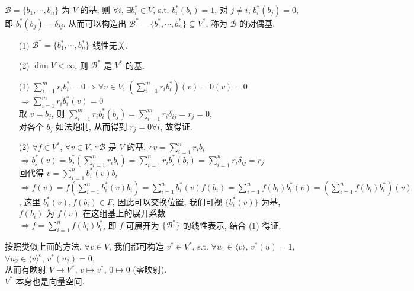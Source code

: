 \documentclass{note}
\begin{document}
\begin{df}[对偶基]
    $\mathcal{B}=\{b_1,\cdots,b_n\}$ 为 $V$ 的基, 则 $\forall i$, $\exists b_i^*\in V$, s.t. $b_i^*(b_i)=1$, 对 $j\neq i$, $b_i^*(b_j)=0$, 即 $b_i^*(b_j)=\delta_{ij}$, 从而可以构造出 $\mathcal{B}^*=\{b_1^*,\cdots,b_n^*\}\subseteq V^*$, 称为 $\mathcal{B}$ 的对偶基.
\end{df}

\begin{thm}[(课本定理 3.12)]
    \begin{itemize}
        \item[(1)] $\mathcal{B}^*=\{b_1^*,\cdots,b_n^*\}$ 线性无关.
        \item[(2)] $\dim V<\infty$, 则 $\mathcal{B}^*$ 是 $V^*$ 的基.
    \end{itemize}
\end{thm}
\begin{pf}
    \begin{itemize}
        \item[(1)] $\sum_{i=1}^mr_ib_i^*=0\Longrightarrow\forall v\in V$, $\left(\sum_{i=1}^mr_ib_i^*\right)(v)=0(v)=0$\\
        $\Longrightarrow\sum_{i=1}^mr_ib_i^*(v)=0$\\
        取 $v=b_j$, 则 $\sum_{i=1}^mr_ib_i^*(b_j)=\sum_{i=1}^mr_i\delta_{ij}=r_j=0$,\\
        对各个 $b_j$ 如法炮制, 从而得到 $r_j=0\forall i$, 故得证.
        \item[(2)] $\forall f\in V^*$, $\forall v\in V$, $\because\mathcal{B}$ 是 $V$ 的基, $\therefore v=\sum_{i=1}^nr_ib_i$\\
        $\Longrightarrow b_j^*(v)=b_j^*\left(\sum_{i=1}^nr_ib_i\right)=\sum_{i=1}^nr_ib_j^*(b_i)=\sum_{i=1}^nr_i\delta_{ij}=r_j$\\
        回代得 $v=\sum_{i=1}^nb_i^*(v)b_i$\\
        $\Longrightarrow f(v)=f\left(\sum_{i=1}^nb_i^*(v)b_i\right)=\sum_{i=1}^nb_i^*(v)f(b_i)=\sum_{i=1}^nf(b_i)b_i^*(v)=\left(\sum_{i=1}^nf(b_i)b_i^*\right)(v)$, 这里 $b_i^*(v),f(b_i)\in F$, 因此可以交换位置, 我们可视 $\{b_i^*(v)\}$ 为基, $f(b_i)$ 为 $f(v)$ 在这组基上的展开系数\\
        $\Longrightarrow f=\sum_{i=1}^nf(b_i)b_i^*$, 即 $f$ 可展开为 $\{\mathcal{B}^*\}$ 的线性表示, 结合 (1) 得证.
    \end{itemize}
\end{pf}

按照类似上面的方法, $\forall v\in V$, 我们都可构造 $v^*\in V^*$, s.t. $\forall u_1\in\langle v\rangle$, $v^*(u)=1$, $\forall u_2\in\langle v\rangle^c$, $v^*(u_2)=0$,\\
从而有映射 $V\rightarrow V^*$, $v\mapsto v^*$, $0\mapsto 0$ (零映射).\\
$V^*$ 本身也是向量空间.
\end{document}
